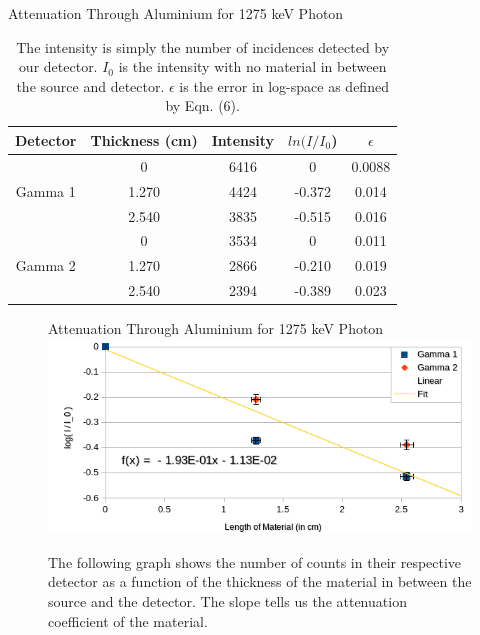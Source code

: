 \documentclass[10pt]{IEEEtran}
\begin{document}
    \begin{table}[!hbt]
      \begin{center}
        \normalsize{Attenuation Through Aluminium for 1275 keV Photon}
        \begin{tabular}{|c|c|c|c|c|}	
			\hline        	
			Detector & Thickness (cm) & Intensity & $ln(I/I_0$) & $\epsilon$ \\
            \hline
            \multirow{3}{*}{Gamma 1} & 0 & 6416 & 0 & 0.0088 \\
            \hhline{~----}
	        & 1.270 & 4424 & -0.372 & 0.014 \\
	        \hhline{~----}
            & 2.540 & 3835 & -0.515 & 0.016 \\
            \hline
            \multirow{3}{*}{Gamma 2} & 0 & 3534 & 0 & 0.011 \\
            \hhline{~----}
            & 1.270 & 2866 & -0.210 & 0.019 \\
            \hhline{~----}
            & 2.540 & 2394 & -0.389 & 0.023 \\
            \hline
       \end{tabular}
       \caption{The intensity is simply the number of incidences detected by our detector. $I_0$ is the intensity with no material in between the source and detector. $\epsilon$ is the error in log-space as defined by Eqn. (6).}
       \label{tab:aluminium1275}
      \end{center}
    \end{table}  

    \begin{figure}[!hbt]
        \begin{center}
             \normalsize{Attenuation Through Aluminium for 1275 keV Photon}
			\includegraphics[width=\linewidth]{Attenuation1275Al}
			\caption{The following graph shows the number of counts in their respective detector as a function of the thickness of the material in between the source and the detector. The slope tells us the attenuation coefficient of the material.}
			\label{fig:1275Al}       
         \end{center}
    \end{figure} 
\end{document}
